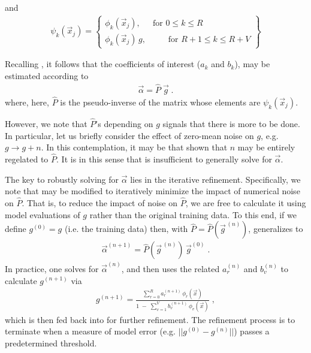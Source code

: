 \documentclass[twocolumn,aps,prd,floatfix,preprintnumbers,a4paper,nofootinbib,
superscriptaddress,10pt]{revtex4-1}
\begin{document}
%
and
%
\begin{align}
  \psi_k(\vec{x}_j) = \left\{\begin{array}{cc}
        \phi_k(\vec{x}_j),      & \text{for }0\leq k\leq R\\
        \phi_k(\vec{x}_j)\, g , & \quad \;\; \;\text{for }R+1\leq k\leq R+V
        \end{array} \right\}
\end{align}
%
\par Recalling , it follows that the coefficients of interest ($a_k$ and $b_k$), may be estimated according to
%
\begin{align}
  \label{eq:pinv2}
  \vec{\alpha} = \hat{P} \; \vec{g} \;.
\end{align}
%
where, here, $\hat{P}$ is the pseudo-inverse of the matrix whose elements are $\psi_k(\vec{x}_j)$.
%
\par However, we note that $\hat{P}$'s depending on $g$ signals that there is more to be done.
%
In particular, let us briefly consider the effect of zero-mean noise on $g$, e.g. $g \rightarrow g+n$.
%
In this contemplation, it may be that shown that $n$ may be entirely regelated to $\hat{P}$.
%
It is in this sense that  is insufficient to generally solve for $\vec{\alpha}$.
%
\par The key to robustly solving for $\vec{\alpha}$ lies in the iterative refinement.
%
Specifically, we note that  may be modified to iteratively minimize the impact of numerical noise on $\hat{P}$.
%
That is, to reduce the impact of noise on $\hat{P}$, we are free to calculate it using model evaluations of $g$ rather than the original training data.
%
To this end, if we define $g^{(0)}=g$ (i.e. the training data) then, with $\hat{P} = \hat{P}( \vec{g}^{\,(n)} )$,  generalizes to
%
\begin{align}
  \label{eq:pinv3}
  \vec{\alpha}^{(n+1)} = \hat{P}(\vec{g}^{\,(n)}) \, \vec{g}^{(0)}\;.
\end{align}
%
In practice, one solves  for $\vec{\alpha}^{(n)}$, and then uses the related $a_r^{(n)}$ and $b_v^{(n)}$ to calculate $g^{(n+1)}$ via
%
\begin{align}
  \label{eq:rat4}
  g^{(n+1)} =  \frac{ \sum_{r=0}^{R} a^{(n+1)}_r \, \phi_{r}(\vec{x}) }{ 1\;-\;  \sum_{v=1}^{V} b^{(n+1)}_v \, \phi_{v}(\vec{x}) } \; ,
\end{align}
%
which is then fed back into  for further refinement.
%
The refinement process is to terminate when a measure of model error (e.g. $||g^{(0)}-g^{(n)}||$) passes a predetermined threshold.
\end{document}
